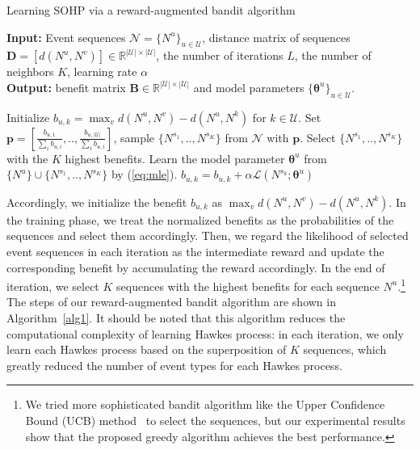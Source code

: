 \documentclass[runningheads]{llncs}
\begin{document}
\begin{algorithm}[t]
\caption{Learning SOHP via a reward-augmented bandit algorithm}\label{alg1}
\hspace*{0.02in} {\bf Input:}
Event sequences $\mathcal{N}=\{N^u\}_{u \in \mathcal{U}}$, distance matrix of sequences $\bm{D}=[d(N^u, N^v)] \in \mathbb{R}^{|\mathcal{U}| \times |\mathcal{U}|}$, the number of iterations $L$, the number of neighbors $K$, learning rate $\alpha$\\
\hspace*{0.02in} {\bf Output:} 
benefit matrix $\bm{B}\in \mathbb{R}^{|\mathcal{U}| \times |\mathcal{U}|}$ and model parameters $\{\bm{\theta}^u\}_{u\in\mathcal{U}}$.
\begin{algorithmic}[1]
    \State Initialize $b_{u,k}=\max_{v}d(N^u, N^v) - d(N^u, N^k)$ for $k \in\mathcal{U}$.
        \State Set $\bm{p}=[\frac{b_{u,1}}{\sum_i b_{u,i}},..,\frac{b_{u,|\mathcal{U}|}}{\sum_i b_{u,i}} ]$, sample $\{N^{s_1},..,N^{s_K}\}$ from $\mathcal{N}$ with $\bm{p}$.
        \Else 
        \State Select $\{N^{s_1},..,N^{s_K}\}$ with the $K$ highest benefits.
        \EndIf
        \State Learn the model parameter $\bm{\theta}^u$ from $ \{N^u\} \cup \{N^{s_1},..,N^{s_K}\}$ by (\ref{eq:mle}).
        \State $b_{u,k} = b_{u,k} + \alpha \mathcal{L}(N^{s_k};\bm{\theta}^u)$
        \EndFor
    \EndFor
\EndFor
\end{algorithmic}
\end{algorithm}

Accordingly, we initialize the benefit $b_{u,k}$ as $\max_{v}d(N^u, N^v) - d(N^u, N^k)$.
In the training phase, we treat the normalized benefits as the probabilities of the sequences and select them accordingly.
Then, we regard the likelihood of selected event sequences in each iteration as the intermediate reward and update the corresponding benefit by accumulating the reward accordingly. 
In the end of iteration, we select $K$ sequences with the highest benefits for each sequence $N^u$.\footnote{We tried more sophisticated bandit algorithm like the Upper Confidence Bound (UCB) method~\cite{audibert2009exploration} to select the sequences, but our experimental results show that the proposed greedy algorithm achieves the best performance.}   
The steps of our reward-augmented bandit algorithm are shown in Algorithm~\ref{alg1}. 
It should be noted that this algorithm reduces the computational complexity of learning Hawkes process: in each iteration, we only learn each Hawkes process based on the superposition of $K$ sequences, which greatly reduced the number of event types for each Hawkes process.
\end{document}
